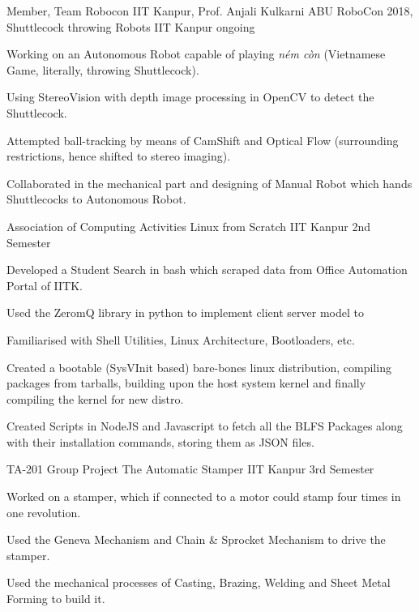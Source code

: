 
\begin{cventries}

  \cventry
  {Member, Team Robocon IIT Kanpur, Prof. Anjali Kulkarni}
		{ABU RoboCon 2018, Shuttlecock throwing Robots}
  {IIT Kanpur}
  {ongoing}
  {
    \begin{cvitems}
	\item Working on an Autonomous Robot capable of playing \textit{ném còn} (Vietnamese Game, literally, throwing Shuttlecock).
	\item Using StereoVision with depth image processing in OpenCV to detect the Shuttlecock.
	\item Attempted ball-tracking by means of CamShift and Optical Flow (surrounding restrictions, hence shifted to stereo imaging).
	\item Collaborated in the mechanical part and designing of Manual Robot which hands Shuttlecocks to Autonomous Robot. 
    \end{cvitems}
  }
  \cventry
  {Association of Computing Activities}
				{Linux from Scratch}
  {IIT Kanpur}
  {2nd Semester}
  {
    \begin{cvitems}
    \item Developed a Student Search in bash which scraped data from Office Automation Portal of IITK. 
    \item Used the ZeromQ library in python to implement client server model to 
    \item Familiarised with Shell Utilities, Linux Architecture, Bootloaders, etc.
	\item Created a bootable (SysVInit based) bare-bones linux distribution, compiling packages from tarballs, building upon the host system kernel and finally compiling the kernel for new distro.
	\item Created Scripts in NodeJS and Javascript to fetch all the BLFS Packages along with their installation commands, storing them as JSON files. 
    \end{cvitems}
  }
  
  	\cventry
  {TA-201 Group Project}
	{The Automatic Stamper}
  {IIT Kanpur}
  {3rd Semester}
  {
    \begin{cvitems}
    \item Worked on a stamper, which if connected to a motor could stamp four times in one revolution.
	\item Used the Geneva Mechanism and Chain \& Sprocket Mechanism to drive the stamper.
    \item Used the mechanical processes of Casting, Brazing, Welding and Sheet Metal Forming to build it.
    \end{cvitems}
  }

\end{cventries}

